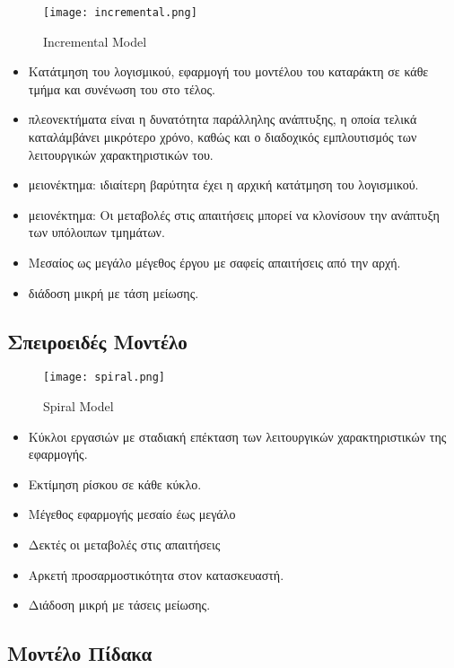 \begin{figure}[H]
	\centering
	\texttt{[image: incremental.png]}
	\caption{Incremental Model}
\end{figure}

\begin{itemize}
	\item	Κατάτμηση του λογισμικού, εφαρμογή του μοντέλου του καταράκτη σε κάθε τμήμα και
		συνένωση του στο τέλος.
	\item	πλεονεκτήματα είναι η δυνατότητα παράλληλης ανάπτυξης, η οποία τελικά καταλάμβάνει
		μικρότερο χρόνο, καθώς και ο διαδοχικός εμπλουτισμός των λειτουργικών χαρακτηριστικών του.
	\item	μειονέκτημα: ιδιαίτερη βαρύτητα έχει η αρχική κατάτμηση του λογισμικού.
	\item	μειονέκτημα: Οι μεταβολές στις απαιτήσεις μπορεί να κλονίσουν την ανάπτυξη των υπόλοιπων τμημάτων.
	\item	Μεσαίος ως μεγάλο μέγεθος έργου με σαφείς απαιτήσεις από την αρχή.
	\item	διάδοση μικρή με τάση μείωσης.
\end{itemize}

\subsection{Σπειροειδές Μοντέλο}

\begin{figure}[H]
	\centering
	\texttt{[image: spiral.png]}
	\caption{Spiral Model}
\end{figure}

\begin{itemize}
	\item	Κύκλοι εργασιών με σταδιακή επέκταση των λειτουργικών χαρακτηριστικών της εφαρμογής.
	\item	Εκτίμηση ρίσκου σε κάθε κύκλο.
	\item	Μέγεθος εφαρμογής μεσαίο έως μεγάλο
	\item	Δεκτές οι μεταβολές στις απαιτήσεις
	\item	Αρκετή προσαρμοστικότητα στον κατασκευαστή.
	\item	Διάδοση μικρή με τάσεις μείωσης.
\end{itemize}

\subsection{Μοντέλο Πίδακα}

